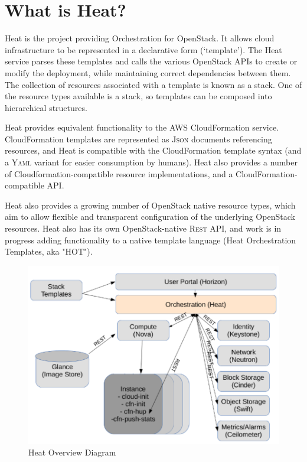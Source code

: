 \section{What is Heat?}

Heat is the project providing Orchestration for OpenStack. It allows cloud infrastructure to be represented in a declarative form (`template'). The Heat service parses these templates and calls the various OpenStack APIs to create or modify the deployment, while maintaining correct dependencies between them. The collection of resources associated with a template is known as a stack. One of the resource types available is a stack, so templates can be composed into hierarchical structures.

Heat provides equivalent functionality to the AWS CloudFormation service. CloudFormation templates are represented as \textsc{Json} documents referencing resources, and Heat is compatible with the CloudFormation template syntax (and a \textsc{Yaml} variant for easier consumption by humans).  Heat also provides a number of Cloudformation-compatible resource implementations, and a CloudFormation-compatible API.

Heat also provides a growing number of OpenStack native resource types, which aim to allow flexible and transparent configuration of the underlying OpenStack resources. Heat also has its own OpenStack-native \textsc{Rest} API, and work is in progress adding functionality to a native template language (Heat Orchestration Templates, aka "HOT").

\begin{figure}[h!]
\caption{Heat Overview Diagram}\label{HeatOverviewFigure}
\centering
\includegraphics[scale=0.5]{images/heat-overview-diagram-small.pdf}
\end{figure}
